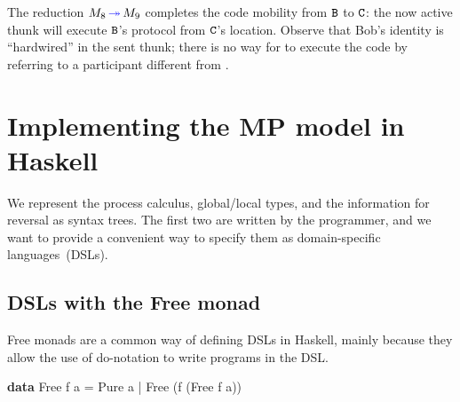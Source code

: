 \documentclass[runningheads,plain]{llncs}
\newcommand{\erase}[1]{\textcolor{orange}{#1}}
\newenvironment{Shaded}{}{}
\newcommand{\KeywordTok}[1]{\textcolor[rgb]{0.00,0.44,0.13}{\textbf{#1}}}
\newcommand{\DataTypeTok}[1]{\textcolor[rgb]{0.56,0.13,0.00}{#1}}
\newcommand{\FunctionTok}[1]{\textcolor[rgb]{0.02,0.16,0.49}{#1}}
\newcommand{\NormalTok}[1]{#1}
\begin{document}
The reduction $M_8 \textcolor{blue}{\,\twoheadrightarrow\,} M_9$ completes the code mobility from $\mathtt{B}$ to $\mathtt{C}$: the now active thunk
will execute $\mathtt{B}$'s protocol from $\mathtt{C}$'s location. Observe that Bob's identity \pB is ``hardwired'' in the sent thunk; 
there is no way for \pC to execute the code by referring to a participant different  from \pB.



\section{Implementing the MP model in Haskell}
\label{implementing-the-ppdp17-calculus-in-haskell}

We represent the process calculus, global/local types, and the information for reversal as syntax trees. 
The first two are written by the programmer, and we want to provide a convenient way to specify them as domain-specific languages~(DSLs). 

\subsection{DSLs with the Free monad}

Free monads are a common way of defining DSLs in Haskell, mainly because they allow the use of do-notation to write programs in the DSL.
\begin{Shaded}
\begin{Highlighting}[]
\KeywordTok{data} \DataTypeTok{Free}\NormalTok{ f a   }
    \FunctionTok{=} \DataTypeTok{Pure}\NormalTok{ a    }
    \FunctionTok{|} \DataTypeTok{Free}\NormalTok{ (f (}\DataTypeTok{Free}\NormalTok{ f a))   }
\end{Highlighting}
\end{Shaded}
\end{document}
